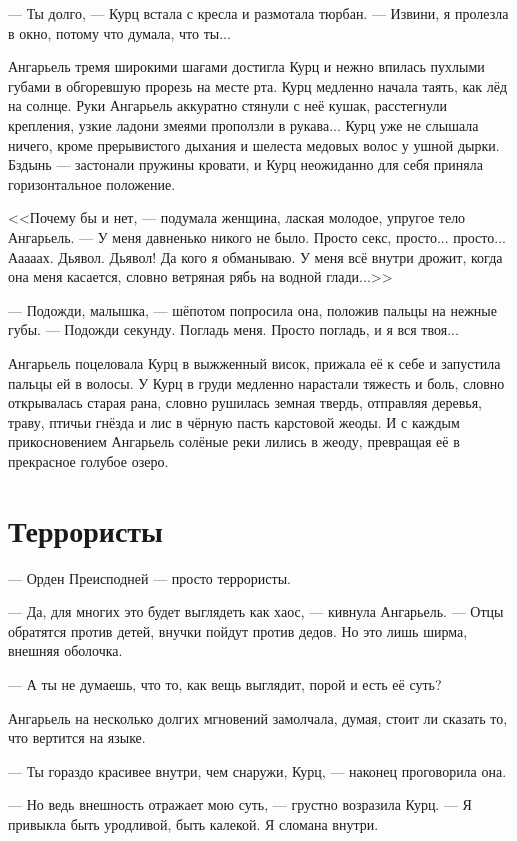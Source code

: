 --- Ты долго, --- Курц встала с кресла и размотала тюрбан.
--- Извини, я пролезла в окно, потому что думала, что ты...

Ангарьель тремя широкими шагами достигла Курц и нежно впилась пухлыми губами в обгоревшую прорезь на месте рта.
Курц медленно начала таять, как лёд на солнце.
Руки Ангарьель аккуратно стянули с неё кушак, расстегнули крепления, узкие ладони змеями проползли в рукава...
Курц уже не слышала ничего, кроме прерывистого дыхания и шелеста медовых волос у ушной дырки.
Бздынь --- застонали пружины кровати, и Курц неожиданно для себя приняла горизонтальное положение.

<<Почему бы и нет, --- подумала женщина, лаская молодое, упругое тело Ангарьель.
--- У меня давненько никого не было.
Просто секс, просто... просто...
Ааааах.
Дьявол.
Дьявол!
Да кого я обманываю.
У меня всё внутри дрожит, когда она меня касается, словно ветряная рябь на водной глади...>>

--- Подожди, малышка, --- шёпотом попросила она, положив пальцы на нежные губы.
--- Подожди секунду.
Погладь меня.
Просто погладь, и я вся твоя...

Ангарьель поцеловала Курц в выжженный висок, прижала её к себе и запустила пальцы ей в волосы.
У Курц в груди медленно нарастали тяжесть и боль, словно открывалась старая рана, словно рушилась земная твердь, отправляя деревья, траву, птичьи гнёзда и лис в чёрную пасть карстовой жеоды.
И с каждым прикосновением Ангарьель солёные реки лились в жеоду, превращая её в прекрасное голубое озеро.

\section{Террористы}

--- Орден Преисподней --- просто террористы.

--- Да, для многих это будет выглядеть как хаос, --- кивнула Ангарьель.
--- Отцы обратятся против детей, внучки пойдут против дедов.
Но это лишь ширма, внешняя оболочка.

--- А ты не думаешь, что то, как вещь выглядит, порой и есть её суть?

Ангарьель на несколько долгих мгновений замолчала, думая, стоит ли сказать то, что вертится на языке.

--- Ты гораздо красивее внутри, чем снаружи, Курц, --- наконец проговорила она.

--- Но ведь внешность отражает мою суть, --- грустно возразила Курц.
--- Я привыкла быть уродливой, быть калекой.
Я сломана внутри.

